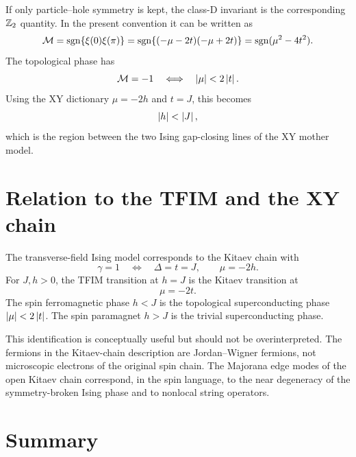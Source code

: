 If only particle--hole symmetry is kept, the class-D invariant is the
corresponding $\mathbb{Z}_2$ quantity.  In the present convention it can be written as
\begin{equation}
\label{eq:kitaev-pfaffian-invariant}
    \mathcal{M}
    =
    \operatorname{sgn}\{\xi(0)\xi(\pi)\}
    =
    \operatorname{sgn}\{(-\mu-2t)(-\mu+2t)\}
    =
    \operatorname{sgn}(\mu^2-4t^2).
\end{equation}
The topological phase has
\begin{equation}
\label{eq:kitaev-class-d-nontrivial}
    \mathcal{M}=-1
    \quad\Longleftrightarrow\quad
    \left|\mu\right|<2\left|t\right|.
\end{equation}
Using the XY dictionary $\mu=-2h$ and $t=J$, this becomes
\begin{equation}
\label{eq:kitaev-xy-topological-condition}
    \left|h\right|<\left|J\right|,
\end{equation}
which is the region between the two Ising gap-closing lines of the XY mother
model.

\section{Relation to the TFIM and the XY chain}
\label{sec:kitaev-relation-to-tfim-xy}

The transverse-field Ising model corresponds to the Kitaev chain with
\begin{equation}
\label{eq:kitaev-tfim-dictionary}
    \gamma=1
    \quad\Longleftrightarrow\quad
    \Delta=t=J,
    \qquad
    \mu=-2h.
\end{equation}
For $J,h>0$, the TFIM transition at $h=J$ is the Kitaev transition at
\begin{equation}
    \mu=-2t.
\end{equation}
The spin ferromagnetic phase $h<J$ is the topological superconducting phase
$\left|\mu\right|<2\left|t\right|$.  The spin paramagnet $h>J$ is the trivial superconducting
phase.

This identification is conceptually useful but should not be overinterpreted.
The fermions in the Kitaev-chain description are Jordan--Wigner fermions, not
microscopic electrons of the original spin chain.  The Majorana edge modes of
the open Kitaev chain correspond, in the spin language, to the near degeneracy of
the symmetry-broken Ising phase and to nonlocal string operators.

\section{Summary}
\label{sec:kitaev-summary}

